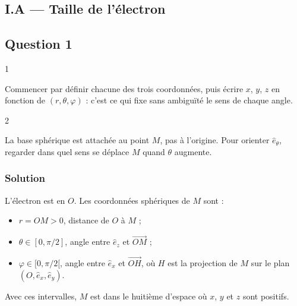 \documentclass[11pt,a4paper]{article}
\providecommand{\tightlist}{\setlength{\itemsep}{0pt}\setlength{\parskip}{0pt}}
\newcommand{\equationajustee}[1]{%
  \sbox{\boiteequation}{$\displaystyle #1$}%
  \ifdim\wd\boiteequation>\linewidth
    \[\resizebox{\linewidth}{!}{\usebox{\boiteequation}}\]%
  \else
    \[#1\]%
  \fi}
\begin{document}
\hypertarget{i.a-taille-de-luxe9lectron}{%
\subsection{I.A --- Taille de l'électron}\label{i.a-taille-de-luxe9lectron}}

\hypertarget{question-1}{%
\subsection{Question 1}\label{question-1}}

\begin{indication}{1}

Commencer par définir chacune des trois coordonnées, puis écrire \(x\), \(y\), \(z\) en fonction de \((r,\theta,\varphi)\) : c'est ce qui fixe sans ambiguïté le sens de chaque angle.

\end{indication}

\begin{indication}{2}

La base sphérique est attachée au point \(M\), pas à l'origine. Pour orienter \(\hat e_\theta\), regarder dans quel sens se déplace \(M\) quand \(\theta\) augmente.

\end{indication}

\hypertarget{solution}{%
\subsubsection{Solution}\label{solution}}

L'électron est en \(O\). Les coordonnées sphériques de \(M\) sont :

\begin{itemize}
\tightlist
\item
  \(r=OM>0\), distance de \(O\) à \(M\) ;
\item
  \(\theta\in[0,\pi/2]\), angle entre \(\hat e_z\) et \(\overrightarrow{OM}\) ;
\item
  \(\varphi\in[0,\pi/2[\), angle entre \(\hat e_x\) et \(\overrightarrow{OH}\), où \(H\) est la projection de \(M\) sur le plan \((O,\hat e_x,\hat e_y)\).
\end{itemize}

\equationajustee{\begin{aligned}
x&=r\sin\theta\cos\varphi\\
y&=r\sin\theta\sin\varphi\\
z&=r\cos\theta
\end{aligned}}
Avec ces intervalles, \(M\) est dans le huitième d'espace où \(x\), \(y\) et \(z\) sont positifs.
\end{document}

